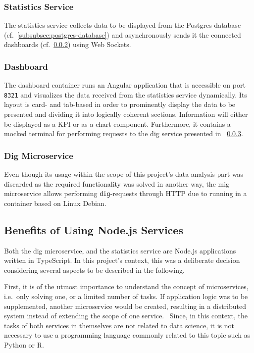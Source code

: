 \subsubsection{Statistics Service}\label{subsubsec:statistics-service}

The statistics service collects data to be displayed from the Postgres database (cf.~\ref{subsubsec:postgres-database}) and asynchronously sends it the connected dashboards (cf.~\ref{subsubsec:dashboard}) using Web Sockets.~\autocite[cf.][]{MDNWebDocs.2021}

\subsubsection{Dashboard}\label{subsubsec:dashboard}

The dashboard container runs an Angular application that is accessible on port \texttt{8321} and visualizes the data received from the statistics service dynamically.
Its layout is card- and tab-based in order to prominently display the data to be presented and dividing it into logically coherent sections.
Information will either be displayed as a KPI or as a chart component.
Furthermore, it contains a mocked terminal for performing requests to the dig service presented in ~\ref{subsubsec:dig-microservice}.

\subsubsection{Dig Microservice}\label{subsubsec:dig-microservice}

Even though its usage within the scope of this project's data analysis part was discarded as the required functionality was solved in another way, the mig microservice allows performing \texttt{dig}-requests through HTTP due to running in a container based on Linux Debian.

\subsection{Benefits of Using Node.js Services}\label{subsec:choosing-a-node-based-environment}

Both the dig microservice, and the statistics service are Node.js applications written in TypeScript.
In this project's context, this was a deliberate decision considering several aspects to be described in the following.

First, it is of the utmost importance to understand the concept of microservices, i.e.\ only solving one, or a limited number of tasks.
If application logic was to be supplemented, another microservice would be created, resulting in a distributed system instead of extending the scope of one service.~\autocite[cf.][p. 23]{Farcic.2016}
Since, in this context, the tasks of both services in themselves are not related to data science, it is not necessary to use a programming language commonly related to this topic such as Python or R.~\autocite[cf.][]{Gossett.2021}

